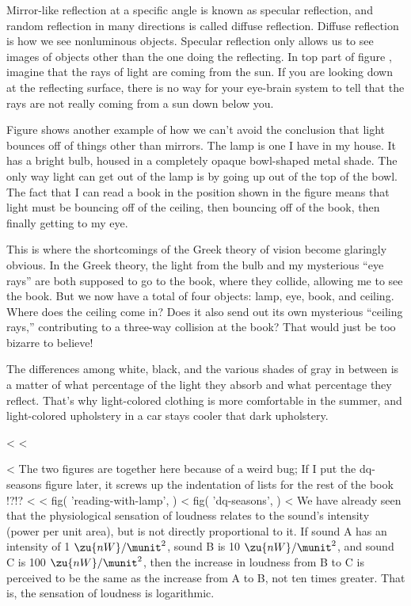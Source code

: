 Mirror-like reflection at a specific angle is known as
specular reflection, and random reflection in many
directions is called diffuse
reflection. Diffuse reflection is how we see nonluminous
objects. Specular reflection only allows us to see images of
objects other than the one doing the reflecting. In top part
of figure , imagine that the rays of light are coming
from the sun. If you are looking down at the reflecting
surface, there is no way for your eye-brain system to tell
that the rays are not really coming from a sun down below you.

Figure  shows another example of how we can't avoid the
conclusion that light bounces off of things other than
mirrors. The lamp is one I have in my house. It has a bright
bulb, housed in a completely opaque bowl-shaped metal shade.
The only way light can get out of the lamp is by going up
out of the top of the bowl. The fact that I can read a book
in the position shown in the figure means that light must be
bouncing off of the ceiling, then bouncing off of the book,
then finally getting to my eye.

This is where the shortcomings of the Greek theory of vision
become glaringly obvious. In the Greek theory, the light
from the bulb and my mysterious ``eye rays'' are both
supposed to go to the book, where they collide, allowing me
to see the book. But we now have a total of four objects:
lamp, eye, book, and ceiling. Where does the ceiling come
in? Does it also send out its own mysterious ``ceiling
rays,'' contributing to a three-way collision at the book?
That would just be too bizarre to believe!

The differences among white, black, and the various shades
of gray in between is a matter of what percentage of the
light they absorb and what percentage they reflect. That's
why light-colored clothing is more comfortable in the
summer, and light-colored upholstery in a car stays cooler
that dark upholstery.

\pagebreak[4]

<%
<%

<%
 The two figures are together here because of a weird bug;
 If I put the dq-seasons figure later, it screws up the
 indentation of lists for the rest of the book !?!?
<%
<%
  fig(
    'reading-with-lamp',
  )
\vspace{43mm}
<%
  fig(
    'dq-seasons',
  )
<%
We have already seen that the physiological sensation of
loudness relates to the sound's intensity (power per unit
area), but is not directly proportional to it. If sound A
has an intensity of 1 $\zu{nW}/\munit^2$, sound B is 10 $\zu{nW}/\munit^2$,
and sound C is 100 $\zu{nW}/\munit^2$, then the increase in loudness
from B to C is perceived to be the same as the increase
from A to B, not ten times greater. That is, the sensation
of loudness is logarithmic.


